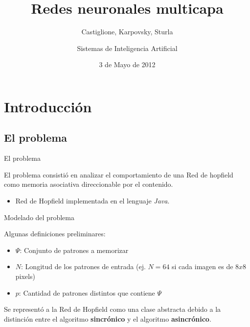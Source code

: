 \documentclass{beamer}
\title{Redes neuronales multicapa}
\subtitle{Castiglione, Karpovsky, Sturla }
\author{Sistemas de Inteligencia Artificial}
\date{3 de Mayo de 2012}
\begin{document}
\frame{\titlepage}

\section[Outline]{}
\frame{\tableofcontents}

\section{Introducción}
\subsection{El problema}
\begin{frame}{El problema}


\par El problema consistió en analizar el comportamiento de una Red de hopfield como memoria asociativa direccionable por el contenido.\\
\begin{itemize}
\item Red de Hopfield implementada en el lenguaje \textit{Java}.
\end{itemize}
\end{frame}

\begin{frame}{Modelado del problema}

\par Algunas definiciones preliminares:\\
\begin{itemize}
\item \textbf{$\Psi$}: Conjunto de patrones a memorizar
\item \textbf{$N$}: Longitud de los patrones de entrada (ej. $N = 64$ si cada imagen es de $8x8$ pixels)
\item \textbf{$p$}: Cantidad de patrones distintos que contiene $\Psi$\\
\end{itemize}

\par Se representó a la Red de Hopfield  como una clase abstracta debido a la distinción entre el algoritmo \textbf{sincrónico} y el algoritmo \textbf{asincrónico}.\\
\end{frame}
\end{document}
